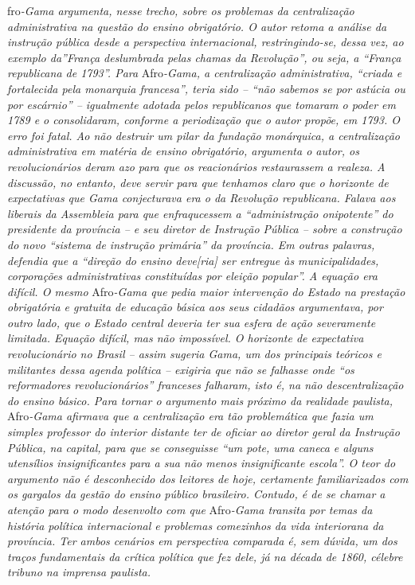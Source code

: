 \begin{didascalia}
fro\emph{-Gama argumenta, nesse trecho, sobre os problemas da
centralização administrativa na questão do ensino obrigatório. O autor
retoma a análise da instrução pública desde a perspectiva internacional,
restringindo-se, dessa vez, ao exemplo da''França deslumbrada pelas
chamas da Revolução'', ou seja, a ``França republicana de 1793''. Para}
Afro\emph{-Gama, a centralização administrativa, ``criada e fortalecida
pela monarquia francesa'', teria sido -- ``não sabemos se por astúcia ou
por escárnio'' -- igualmente adotada pelos republicanos que tomaram o
poder em 1789 e o consolidaram, conforme a periodização que o autor
propõe, em 1793. O erro foi fatal. Ao não destruir um pilar da fundação
monárquica, a centralização administrativa em matéria de ensino
obrigatório, argumenta o autor, os revolucionários deram azo para que os
reacionários restaurassem a realeza. A discussão, no entanto, deve
servir para que tenhamos claro que o horizonte de expectativas que Gama
conjecturava era o da Revolução republicana. Falava aos liberais da
Assembleia para que enfraqucessem a ``administração onipotente'' do
presidente da província -- e seu diretor de Instrução Pública -- sobre a
construção do novo ``sistema de instrução primária'' da província. Em
outras palavras, defendia que a ``direção do ensino deve{[}ria{]} ser
entregue às municipalidades, corporações administrativas constituídas
por eleição popular''. A equação era difícil. O mesmo} Afro\emph{-Gama
que pedia maior intervenção do Estado na prestação obrigatória e
gratuita de educação básica aos seus cidadãos argumentava, por outro
lado, que o Estado central deveria ter sua esfera de ação severamente
limitada. Equação difícil, mas não impossível. O horizonte de
expectativa revolucionário no Brasil -- assim sugeria Gama, um dos
principais teóricos e militantes dessa agenda política -- exigiria que
não se falhasse onde ``os reformadores revolucionários'' franceses
falharam, isto é, na não descentralização do ensino básico. Para tornar
o argumento mais próximo da realidade paulista,} Afro\emph{-Gama
afirmava que a centralização era tão problemática que fazia um simples
professor do interior distante ter de oficiar ao diretor geral da
Instrução Pública, na capital, para que se conseguisse ``um pote, uma
caneca e alguns utensílios insignificantes para a sua não menos
insignificante escola''. O teor do argumento não é desconhecido dos
leitores de hoje, certamente familiarizados com os gargalos da gestão do
ensino público brasileiro. Contudo, é de se chamar a atenção para o modo
desenvolto com que} Afro\emph{-Gama transita por temas da história
política internacional e problemas comezinhos da vida interiorana da
província. Ter ambos cenários em perspectiva comparada é, sem dúvida, um
dos traços fundamentais da crítica política que fez dele, já na década
de 1860, célebre tribuno na imprensa paulista.}
\end{didascalia}

